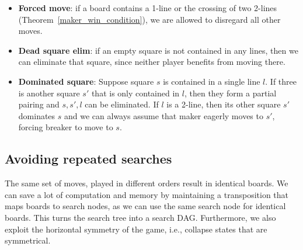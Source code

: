 \documentclass[conference]{IEEEtran}
\theoremstyle{definition}
\begin{document}
\begin{itemize}
    \item {\bf Forced move}: if a board contains a 1-line or the crossing of two 2-lines (Theorem~\ref{maker_win_condition}), we are allowed to disregard all other moves. 
    \item {\bf Dead square elim}: if an empty square is not contained in any lines, then we can eliminate that square, since neither player benefits from moving there.
    \item {\bf Dominated square}: Suppose square $s$ is contained in a single line $l$. If three is another square $s'$ that is only contained in $l$, then they form a partial pairing and $s, s', l$ can be eliminated. If $l$ is a 2-line, then its other square $s'$ dominates $s$ and we can always assume that maker eagerly moves to $s'$, forcing breaker to move to $s$.
\end{itemize}

\subsection{Avoiding repeated searches}
The same set of moves, played in different orders result in identical boards. We can save a lot of computation and memory by maintaining a transposition that maps boards to search nodes, as we can use the same search node for identical boards. This turns the search tree into a search DAG. Furthermore, we also exploit the horizontal symmetry of the game, i.e., collapse states that are symmetrical. 
\end{document}
